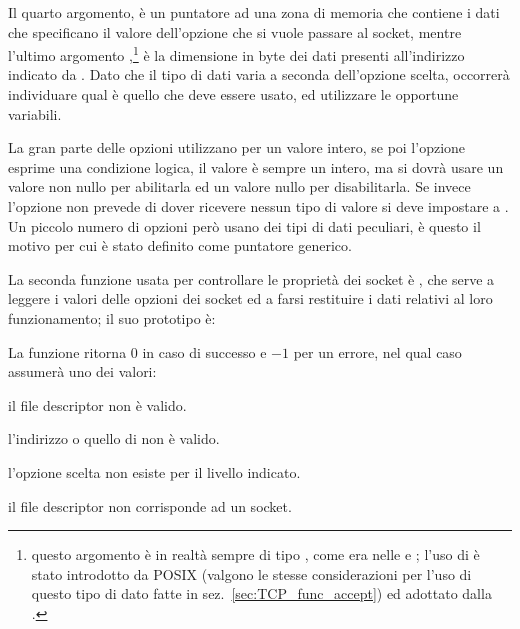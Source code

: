 Il quarto argomento,  è un puntatore ad una zona di memoria che
contiene i dati che specificano il valore dell'opzione che si vuole passare al
socket, mentre l'ultimo argomento ,\footnote{questo argomento è
  in realtà sempre di tipo , come era nelle  e
  ; l'uso di  è stato introdotto da POSIX (valgono
  le stesse considerazioni per l'uso di questo tipo di dato fatte in
  sez.~\ref{sec:TCP_func_accept}) ed adottato dalla .} è la
dimensione in byte dei dati presenti all'indirizzo indicato da .
Dato che il tipo di dati varia a seconda dell'opzione scelta, occorrerà
individuare qual è quello che deve essere usato, ed utilizzare le opportune
variabili.

La gran parte delle opzioni utilizzano per  un valore intero, se
poi l'opzione esprime una condizione logica, il valore è sempre un intero, ma
si dovrà usare un valore non nullo per abilitarla ed un valore nullo per
disabilitarla.  Se invece l'opzione non prevede di dover ricevere nessun tipo
di valore si deve impostare  a . Un piccolo numero
di opzioni però usano dei tipi di dati peculiari, è questo il motivo per cui
 è stato definito come puntatore generico.

La seconda funzione usata per controllare le proprietà dei socket è
, che serve a leggere i valori delle opzioni dei socket ed a
farsi restituire i dati relativi al loro funzionamento; il suo prototipo è:


\begin{funcproto}{
}

{La funzione ritorna $0$ in caso di successo e $-1$ per un errore, nel qual
  caso  assumerà uno dei valori: 
  \begin{errlist}
  \item[\errcode{EBADF}] il file descriptor  non è valido.
  \item[\errcode{EFAULT}] l'indirizzo  o quello di
     non è valido.
  \item[\errcode{ENOPROTOOPT}] l'opzione scelta non esiste per il livello
    indicato. 
  \item[\errcode{ENOTSOCK}] il file descriptor  non corrisponde ad
    un socket.
  \end{errlist}
}
\end{funcproto}

